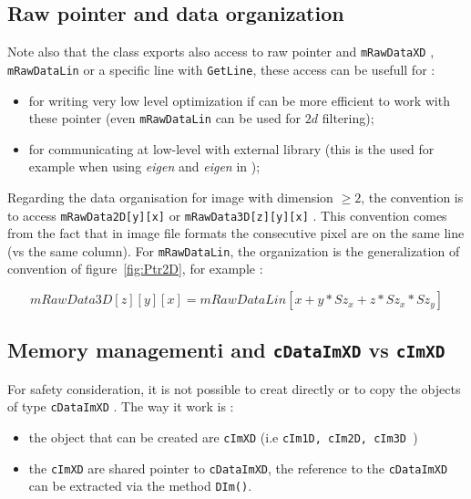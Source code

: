 \subsection{Raw pointer and data organization}

Note also that the class exports also access to raw pointer and {\tt mRawDataXD} , {\tt mRawDataLin}
or a specific line with {\tt GetLine},
these access can be usefull for :

\begin{itemize}
    \item for writing very low level optimization if can be more efficient to work with these
          pointer (even {\tt mRawDataLin} can be used for $2d$ filtering);

    \item for communicating at low-level with external library (this is the used for example
          when using \emph{eigen} and \emph{eigen} in \PPP);

\end{itemize}

Regarding the data organisation for image with dimension $\geq 2$,  the convention
is to access    {\tt mRawData2D[y][x]}  or {\tt mRawData3D[z][y][x]} . This convention
comes from the fact that in image file formats the consecutive pixel are on the same
line (vs the same column). For {\tt mRawDataLin}, the organization is the generalization
of convention of figure~\ref{fig:Ptr2D}, for example :

\begin{equation}
	mRawData3D[z][y][x] = mRawDataLin[x + y * Sz_x + z * Sz_x * Sz_y] \label{EqIm3D}
\end{equation}



\subsection{Memory managementi and {\tt cDataImXD} vs {\tt cImXD} }

For safety consideration, it is not possible to creat directly or to copy
the objects of type {\tt cDataImXD} . The way it work is :

\begin{itemize}
	\item the object that can be created are {\tt cImXD}  (i.e {\tt cIm1D, cIm2D, cIm3D })
	\item the {\tt cImXD} are shared pointer to {\tt cDataImXD}, the reference to the {\tt cDataImXD} can
		be extracted via the method  {\tt  DIm()}.
\end{itemize}

